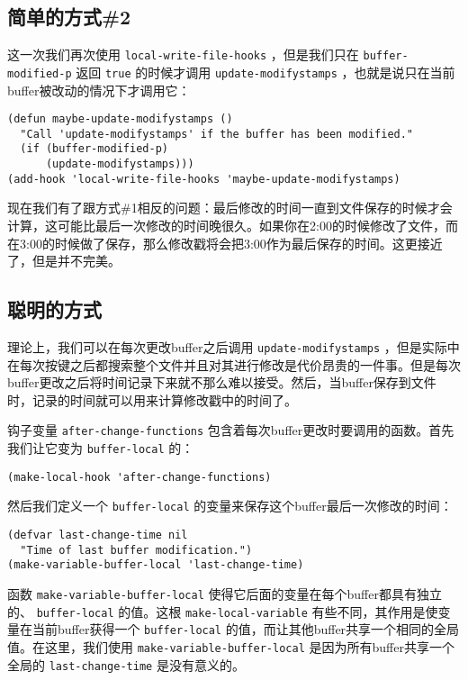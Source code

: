\subsection{简单的方式\#{}2}
\label{section:04-Simple-Approach-2}

这一次我们再次使用 \texttt{local-write-file-hooks} ，但是我们只在 \texttt{buffer-modified-p} 返回 \texttt{true} 的时候才调用 \texttt{update-modifystamps} ，也就是说只在当前buffer被改动的情况下才调用它：

\begin{verbatim}
(defun maybe-update-modifystamps ()
  "Call 'update-modifystamps' if the buffer has been modified."
  (if (buffer-modified-p)
      (update-modifystamps)))
(add-hook 'local-write-file-hooks 'maybe-update-modifystamps)
\end{verbatim}

现在我们有了跟方式\#1相反的问题：最后修改的时间一直到文件保存的时候才会计算，这可能比最后一次修改的时间晚很久。如果你在2:00的时候修改了文件，而在3:00的时候做了保存，那么修改戳将会把3:00作为最后保存的时间。这更接近了，但是并不完美。

\subsection{聪明的方式}
\label{section:04-Clever-Approach}

理论上，我们可以在每次更改buffer之后调用 \texttt{update-modifystamps} ，但是实际中在每次按键之后都搜索整个文件并且对其进行修改是代价昂贵的一件事。但是每次buffer更改之后将时间记录下来就不那么难以接受。然后，当buffer保存到文件时，记录的时间就可以用来计算修改戳中的时间了。

钩子变量 \texttt{after-change-functions} 包含着每次buffer更改时要调用的函数。首先我们让它变为 \texttt{buffer-local} 的：

\begin{verbatim}
(make-local-hook 'after-change-functions)
\end{verbatim}

然后我们定义一个 \texttt{buffer-local} 的变量来保存这个buffer最后一次修改的时间：

\begin{verbatim}
(defvar last-change-time nil
  "Time of last buffer modification.")
(make-variable-buffer-local 'last-change-time)
\end{verbatim}

函数 \texttt{make-variable-buffer-local} 使得它后面的变量在每个buffer都具有独立的、 \texttt{buffer-local} 的值。这根 \texttt{make-local-variable} 有些不同，其作用是使变量在当前buffer获得一个 \texttt{buffer-local} 的值，而让其他buffer共享一个相同的全局值。在这里，我们使用 \texttt{make-variable-buffer-local} 是因为所有buffer共享一个全局的 \texttt{last-change-time} 是没有意义的。

